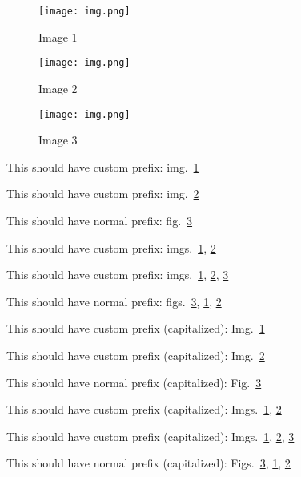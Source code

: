 \begin{figure}
\hypertarget{fig:1}{%
\centering
\texttt{[image: img.png]}
\caption{Image 1}\label{fig:1}
}
\end{figure}

\begin{figure}
\hypertarget{fig:2}{%
\centering
\texttt{[image: img.png]}
\caption{Image 2}\label{fig:2}
}
\end{figure}

\begin{figure}
\hypertarget{fig:3}{%
\centering
\texttt{[image: img.png]}
\caption{Image 3}\label{fig:3}
}
\end{figure}

This should have custom prefix: img.~\ref{fig:1}

This should have custom prefix: img.~\ref{fig:2}

This should have normal prefix: fig.~\ref{fig:3}

This should have custom prefix: imgs.~\ref{fig:1}, \ref{fig:2}

This should have custom prefix:
imgs.~\ref{fig:1}, \ref{fig:2}, \ref{fig:3}

This should have normal prefix:
figs.~\ref{fig:3}, \ref{fig:1}, \ref{fig:2}

This should have custom prefix (capitalized): Img.~\ref{fig:1}

This should have custom prefix (capitalized): Img.~\ref{fig:2}

This should have normal prefix (capitalized): Fig.~\ref{fig:3}

This should have custom prefix (capitalized):
Imgs.~\ref{fig:1}, \ref{fig:2}

This should have custom prefix (capitalized):
Imgs.~\ref{fig:1}, \ref{fig:2}, \ref{fig:3}

This should have normal prefix (capitalized):
Figs.~\ref{fig:3}, \ref{fig:1}, \ref{fig:2}
